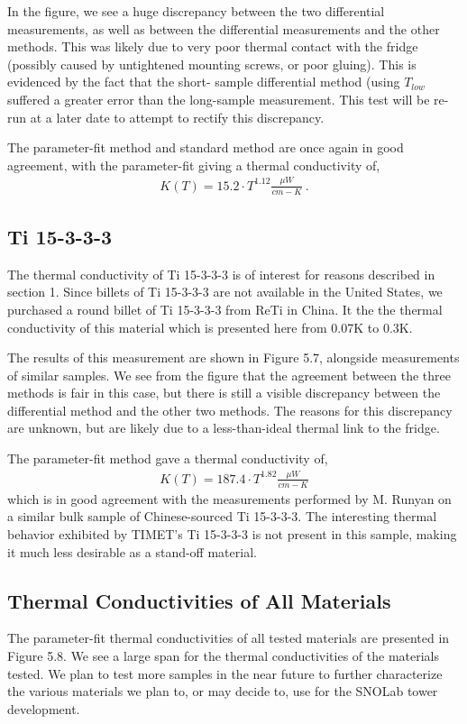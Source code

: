 \documentclass{report}
\begin{document}
In the figure, we see a huge discrepancy between the two differential measurements, as well as between the differential measurements and the other methods. This was likely due to very poor thermal contact with the fridge (possibly caused by untightened mounting screws, or poor gluing). This is evidenced by the fact that the short- sample differential method (using $T_{low}$ suffered a greater error than the long-sample measurement. This test will be re-run at a later date to attempt to rectify this discrepancy.

The parameter-fit method and standard method are once again in good agreement, with the parameter-fit giving a thermal conductivity of,
\begin{eqnarray}
K(T) = 15.2 \cdot T^{1.12} \frac{\mu W}{cm-K} \ .
\end{eqnarray}

\subsection{Ti 15-3-3-3}
The thermal conductivity of Ti 15-3-3-3 is of interest for reasons described in section 1. Since billets of Ti 15-3-3-3 are not available in the United States, we purchased a round billet of Ti 15-3-3-3 from ReTi in China. It the the thermal conductivity of this material which is presented here from 0.07K to 0.3K.

The results of this measurement are shown in Figure 5.7, alongside measurements of similar samples. We see from the figure that the agreement between the three methods is fair in this case, but there is still a visible discrepancy between the differential method and the other two methods. The reasons for this discrepancy are unknown, but are likely due to a less-than-ideal thermal link to the fridge.

The parameter-fit method gave a thermal conductivity of,
\begin{eqnarray}
K(T) = 187.4 \cdot T^{1.82} \frac{\mu W}{cm-K}
\end{eqnarray}
which is in good agreement with the measurements performed by M. Runyan on a similar bulk sample of Chinese-sourced Ti 15-3-3-3. The interesting thermal behavior exhibited by TIMET's Ti 15-3-3-3 is not present in this sample, making it much less desirable as a stand-off material.


\subsection{Thermal Conductivities of All Materials}
The parameter-fit thermal conductivities of all tested materials are presented in Figure 5.8. We see a large span for the thermal conductivities of the materials tested. We plan to test more samples in the near future to further characterize the various materials we plan to, or may decide to, use for the SNOLab tower development.
\end{document}
